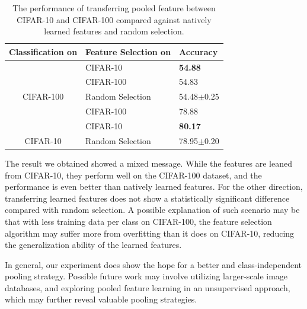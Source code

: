 \begin{table}
  \centering
  \begin{tabular}{c|l|l}
    \hline
    Classification on & Feature Selection on & Accuracy \\
    \hline
          & CIFAR-10     & {\bfseries 54.88} \\ %
          & CIFAR-100      & 54.83\\ %
    CIFAR-100 %
          & Random Selection & 54.48$\pm$0.25\\
    \hline
             & CIFAR-100    & 78.88 \\ %
             & CIFAR-10     & {\bfseries 80.17}\\ %
    CIFAR-10 %
             & Random Selection & 78.95$\pm$0.20\\

    \hline
  \end{tabular}
  \caption{The performance of transferring pooled feature between CIFAR-10 and CIFAR-100 compared against natively learned features and random selection.}\label{table:transfer}
\end{table}

The result we obtained showed a mixed message. While the features are leaned from CIFAR-10, they perform well on the CIFAR-100 dataset, and the performance is even better than natively learned features. For the other direction, transferring learned features does not show a statistically significant difference compared with random selection. A possible explanation of such scenario may be that with less training data per class on CIFAR-100, the feature selection algorithm may suffer more from overfitting than it does on CIFAR-10, reducing the generalization ability of the learned features.

In general, our experiment does show the hope for a better and class-independent pooling strategy. Possible future work may involve utilizing larger-scale image databases, and exploring pooled feature learning in an unsupervised approach, which may further reveal valuable pooling strategies.